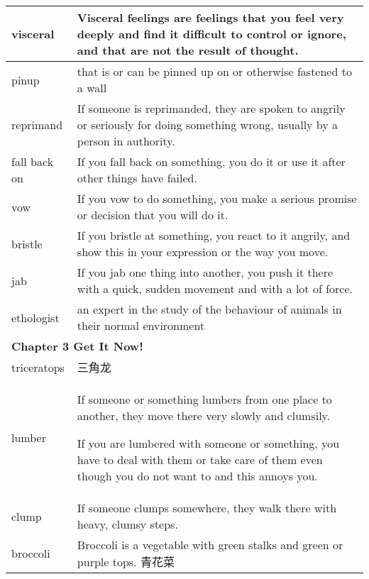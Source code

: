 \documentclass{article}
\begin{document}
\begin{center}
\begin{longtable}{|l|p{9cm}|}
\hline
visceral
&
Visceral feelings are feelings that you feel very deeply and find it difficult to control or ignore, and that are not the result of thought.
\\

\hline
pinup
&
that is or can be pinned up on or otherwise fastened to a wall
\\

\hline
reprimand
&
If someone is reprimanded, they are spoken to angrily or seriously for doing something wrong, usually by a person in authority.
\\

\hline
fall back on
&
If you fall back on something, you do it or use it after other things have failed.
\\

\hline
vow
&
If you vow to do something, you make a serious promise or decision that you will do it.
\\

\hline
bristle
&
If you bristle at something, you react to it angrily, and show this in your expression or the way you move.
\\

\hline
jab
&
If you jab one thing into another, you push it there with a quick, sudden movement and with a lot of force.
\\

\hline
ethologist
&
an expert in the study of the behaviour of animals in their normal environment
\\

\hline
\multicolumn{2}{|l|}{\textbf{Chapter 3 Get It Now!}}\\

\hline
triceratops
&
三角龙
\\

\hline
lumber
&
If someone or something lumbers from one place to another, they move there very slowly and clumsily.
\par
If you are lumbered with someone or something, you have to deal with them or take care of them even though you do not want to and this annoys you.
\\

\hline
clump
&
If someone clumps somewhere, they walk there with heavy, clumsy steps.
\\

\hline
broccoli
&
Broccoli is a vegetable with green stalks and green or purple tops. 青花菜
\\


\end{longtable}
\end{center}
\end{document}
